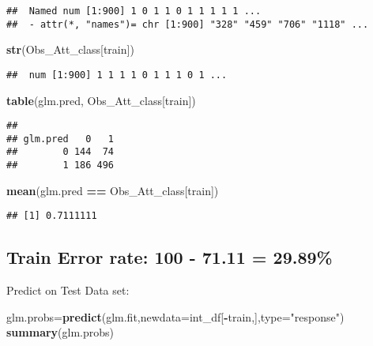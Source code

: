\documentclass[]{article}
\newenvironment{Shaded}{\begin{snugshade}}{\end{snugshade}}
\newcommand{\KeywordTok}[1]{\textcolor[rgb]{0.13,0.29,0.53}{\textbf{#1}}}
\newcommand{\DataTypeTok}[1]{\textcolor[rgb]{0.13,0.29,0.53}{#1}}
\newcommand{\StringTok}[1]{\textcolor[rgb]{0.31,0.60,0.02}{#1}}
\newcommand{\OperatorTok}[1]{\textcolor[rgb]{0.81,0.36,0.00}{\textbf{#1}}}
\newcommand{\NormalTok}[1]{#1}
\begin{document}
\begin{verbatim}
##  Named num [1:900] 1 0 1 1 0 1 1 1 1 1 ...
##  - attr(*, "names")= chr [1:900] "328" "459" "706" "1118" ...
\end{verbatim}

\begin{Shaded}
\begin{Highlighting}[]
\KeywordTok{str}\NormalTok{(Obs_Att_class[train])}
\end{Highlighting}
\end{Shaded}

\begin{verbatim}
##  num [1:900] 1 1 1 1 0 1 1 1 0 1 ...
\end{verbatim}

\begin{Shaded}
\begin{Highlighting}[]
\KeywordTok{table}\NormalTok{(glm.pred, Obs_Att_class[train])}
\end{Highlighting}
\end{Shaded}

\begin{verbatim}
##         
## glm.pred   0   1
##        0 144  74
##        1 186 496
\end{verbatim}

\begin{Shaded}
\begin{Highlighting}[]
\KeywordTok{mean}\NormalTok{(glm.pred }\OperatorTok{==}\StringTok{ }\NormalTok{Obs_Att_class[train])}
\end{Highlighting}
\end{Shaded}

\begin{verbatim}
## [1] 0.7111111
\end{verbatim}

\subsection{Train Error rate: 100 - 71.11 =
29.89\%}\label{train-error-rate-100---71.11-29.89}

Predict on Test Data set:

\begin{Shaded}
\begin{Highlighting}[]
\NormalTok{glm.probs=}\KeywordTok{predict}\NormalTok{(glm.fit,}\DataTypeTok{newdata=}\NormalTok{int_df[}\OperatorTok{-}\NormalTok{train,],}\DataTypeTok{type=}\StringTok{"response"}\NormalTok{)}
\KeywordTok{summary}\NormalTok{(glm.probs)}
\end{Highlighting}
\end{Shaded}
\end{document}

